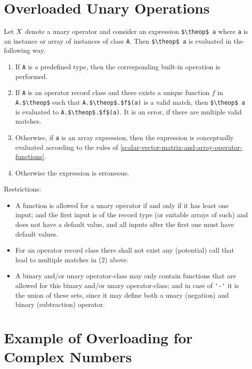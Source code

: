 \section{Overloaded Unary Operations}\label{overloaded-unary-operations}

Let $X$ denote a unary operator and consider an expression
\lstinline!$\theop$ a! where \lstinline!a! is an instance or array of instances of class
\lstinline!A!. Then \lstinline!$\theop$ a! is evaluated in the following way.

\begin{enumerate}
\item
  If \lstinline!A! is a predefined type, then the corresponding built-in
  operation is performed.
\item
  If \lstinline!A! is an operator record class and there exists a unique
  function $f$ in \lstinline!A.$\theop$! such that \lstinline!A.$\theop$.$f$(a)! is a valid
  match, then \lstinline!$\theop$ a! is evaluated to \lstinline!A.$\theop$.$f$(a)!. It is an
  error, if there are multiple valid matches.
\item
  Otherwise, if \lstinline!a! is an array expression, then the expression
  is conceptually evaluated according to the rules of \cref{scalar-vector-matrix-and-array-operator-functions}.
\item
  Otherwise the expression is erroneous.
\end{enumerate}

Restrictions:
\begin{itemize}
\item
  A function is allowed for a unary operator if and only if it has least
  one input; and the first input is of the record type (or suitable
  arrays of such) and does not have a default value, and all inputs
  after the first one must have default values.
\item
  For an operator record class there shall not exist any
  (potential) call that lead to multiple matches in (2) above.
\item
  A binary and/or unary operator-class may only contain functions that
  are allowed for this binary and/or unary operator-class; and in case
  of \lstinline!'-'! it is the union of these sets, since it may define both a unary
  (negation) and binary (subtraction) operator.
\end{itemize}

\section{Example of Overloading for Complex Numbers}\label{example-of-overloading-for-complex-numbers}

